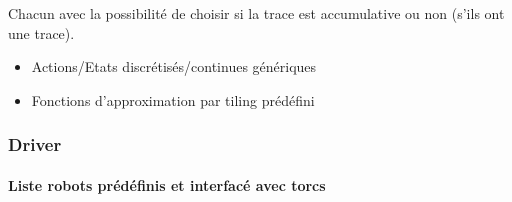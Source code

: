 \documentclass[a4paper,12pt]{article}
\begin{document}
      Chacun avec la possibilité de choisir si la trace est accumulative ou non (s'ils ont une trace).
      
      \begin{itemize}
       \item Actions/Etats discrétisés/continues génériques
       \item Fonctions d'approximation par tiling prédéfini
      \end{itemize}

      
      \subsubsection{Driver}
      
      \paragraph{Liste robots prédéfinis et interfacé avec torcs}
\end{document}

